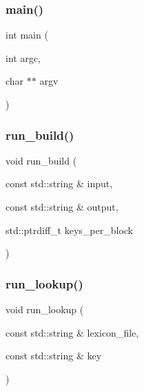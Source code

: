 \subsubsection{\texorpdfstring{main()}{main()}}
{\footnotesize\ttfamily int main (\begin{DoxyParamCaption}\item[{int}]{argc,  }\item[{char $\ast$$\ast$}]{argv }\end{DoxyParamCaption})}

\mbox{\label{irk-lexicon_8cpp_af2415706bbd77d21f123a7ca0ba56b01}} 
\subsubsection{\texorpdfstring{run\+\_\+build()}{run\_build()}}
{\footnotesize\ttfamily void run\+\_\+build (\begin{DoxyParamCaption}\item[{const std\+::string \&}]{input,  }\item[{const std\+::string \&}]{output,  }\item[{std\+::ptrdiff\+\_\+t}]{keys\+\_\+per\+\_\+block }\end{DoxyParamCaption})}

\mbox{\label{irk-lexicon_8cpp_ad74bcd0574f94df63c400143e14c67d4}} 
\subsubsection{\texorpdfstring{run\+\_\+lookup()}{run\_lookup()}}
{\footnotesize\ttfamily void run\+\_\+lookup (\begin{DoxyParamCaption}\item[{const std\+::string \&}]{lexicon\+\_\+file,  }\item[{const std\+::string \&}]{key }\end{DoxyParamCaption})}

